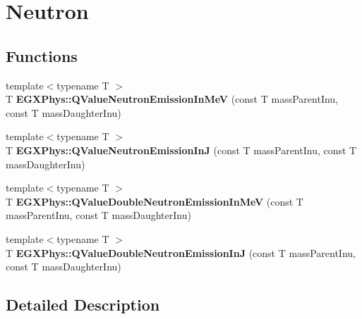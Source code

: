 \hypertarget{group___e_g_x_phys-_q_value-_neutron}{}\section{Neutron}
\label{group___e_g_x_phys-_q_value-_neutron}
\subsection*{Functions}
\begin{DoxyCompactItemize}
\item 
\mbox{\label{group___e_g_x_phys-_q_value-_neutron_ga8ad6e53cb04260eb9b140e22b5b6d9f6}} 
{\footnotesize template$<$typename T $>$ }\\T {\bfseries E\+G\+X\+Phys\+::\+Q\+Value\+Neutron\+Emission\+In\+MeV} (const T mass\+Parent\+Inu, const T mass\+Daughter\+Inu)
\item 
\mbox{\label{group___e_g_x_phys-_q_value-_neutron_gacb17fa06731637937bc65765943d67ca}} 
{\footnotesize template$<$typename T $>$ }\\T {\bfseries E\+G\+X\+Phys\+::\+Q\+Value\+Neutron\+Emission\+InJ} (const T mass\+Parent\+Inu, const T mass\+Daughter\+Inu)
\item 
\mbox{\label{group___e_g_x_phys-_q_value-_neutron_gaeafae8a98e46b701517c1a2b8bfc241d}} 
{\footnotesize template$<$typename T $>$ }\\T {\bfseries E\+G\+X\+Phys\+::\+Q\+Value\+Double\+Neutron\+Emission\+In\+MeV} (const T mass\+Parent\+Inu, const T mass\+Daughter\+Inu)
\item 
\mbox{\label{group___e_g_x_phys-_q_value-_neutron_gae8a2c7bd5c4facaea7615eccdfc47be1}} 
{\footnotesize template$<$typename T $>$ }\\T {\bfseries E\+G\+X\+Phys\+::\+Q\+Value\+Double\+Neutron\+Emission\+InJ} (const T mass\+Parent\+Inu, const T mass\+Daughter\+Inu)
\end{DoxyCompactItemize}


\subsection{Detailed Description}
